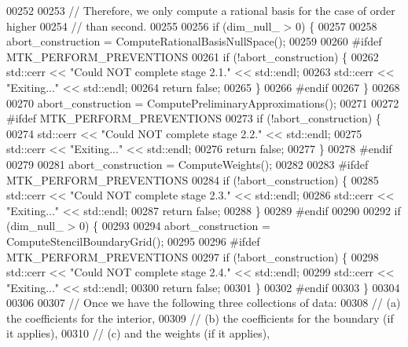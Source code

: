 \begin{DoxyCode}
{{00252 
00253   \textcolor{comment}{// Therefore, we only compute a rational basis for the case of order higher}
00254   \textcolor{comment}{// than second.}
00255 
00256   \textcolor{keywordflow}{if} (dim\_null\_ > 0) \{
00257 
00258     abort\_construction = ComputeRationalBasisNullSpace();
00259 
00260 \textcolor{preprocessor}{    #ifdef MTK\_PERFORM\_PREVENTIONS}
00261     \textcolor{keywordflow}{if} (!abort\_construction) \{
00262       std::cerr << \textcolor{stringliteral}{"Could NOT complete stage 2.1."} << std::endl;
00263       std::cerr << \textcolor{stringliteral}{"Exiting..."} << std::endl;
00264       \textcolor{keywordflow}{return} \textcolor{keyword}{false};
00265     \}
00266 \textcolor{preprocessor}{    #endif}
00267   \}
00268 
00270   abort\_construction = ComputePreliminaryApproximations();
00271 
00272 \textcolor{preprocessor}{  #ifdef MTK\_PERFORM\_PREVENTIONS}
00273   \textcolor{keywordflow}{if} (!abort\_construction) \{
00274     std::cerr << \textcolor{stringliteral}{"Could NOT complete stage 2.2."} << std::endl;
00275     std::cerr << \textcolor{stringliteral}{"Exiting..."} << std::endl;
00276     \textcolor{keywordflow}{return} \textcolor{keyword}{false};
00277   \}
00278 \textcolor{preprocessor}{  #endif}
00279 
00281   abort\_construction = ComputeWeights();
00282 
00283 \textcolor{preprocessor}{  #ifdef MTK\_PERFORM\_PREVENTIONS}
00284   \textcolor{keywordflow}{if} (!abort\_construction) \{
00285     std::cerr << \textcolor{stringliteral}{"Could NOT complete stage 2.3."} << std::endl;
00286     std::cerr << \textcolor{stringliteral}{"Exiting..."} << std::endl;
00287     \textcolor{keywordflow}{return} \textcolor{keyword}{false};
00288   \}
00289 \textcolor{preprocessor}{  #endif}
00290 
00292   \textcolor{keywordflow}{if} (dim\_null\_ > 0) \{
00293 
00294     abort\_construction = ComputeStencilBoundaryGrid();
00295 
00296 \textcolor{preprocessor}{    #ifdef MTK\_PERFORM\_PREVENTIONS}
00297     \textcolor{keywordflow}{if} (!abort\_construction) \{
00298       std::cerr << \textcolor{stringliteral}{"Could NOT complete stage 2.4."} << std::endl;
00299       std::cerr << \textcolor{stringliteral}{"Exiting..."} << std::endl;
00300       \textcolor{keywordflow}{return} \textcolor{keyword}{false};
00301     \}
00302 \textcolor{preprocessor}{    #endif}
00303   \}
00304 
00306 
00307   \textcolor{comment}{// Once we have the following three collections of data:}
00308   \textcolor{comment}{//   (a) the coefficients for the interior,}
00309   \textcolor{comment}{//   (b) the coefficients for the boundary (if it applies),}
00310   \textcolor{comment}{//   (c) and the weights (if it applies),}
}}
\end{DoxyCode}
